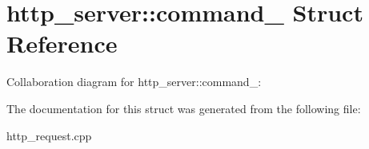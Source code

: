 \hypertarget{structhttp__server_1_1command__}{\section{http\-\_\-server\-:\-:command\-\_\- Struct Reference}
\label{structhttp__server_1_1command__}
}


Collaboration diagram for http\-\_\-server\-:\-:command\-\_\-\-:


The documentation for this struct was generated from the following file\-:\begin{DoxyCompactItemize}
\item 
http\-\_\-request.\-cpp\end{DoxyCompactItemize}
